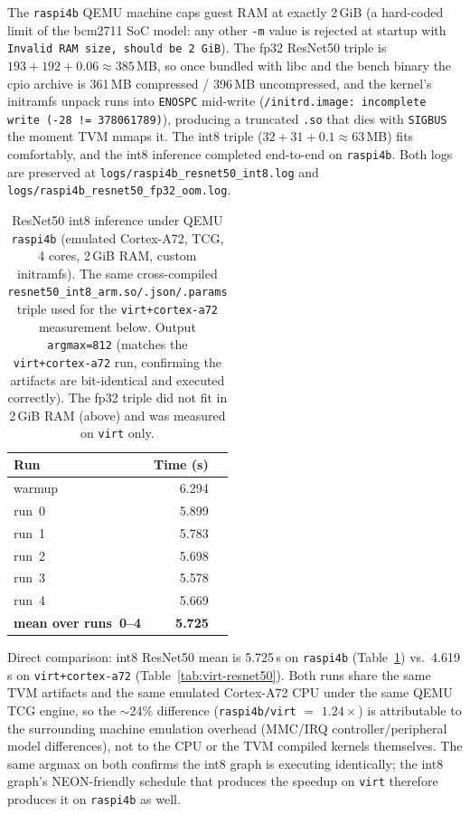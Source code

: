 \documentclass[11pt,a4paper]{article}
\begin{document}
The \texttt{raspi4b} QEMU machine caps guest RAM at exactly 2\,GiB (a hard-coded limit of the bcm2711 SoC model: any other \texttt{-m} value is rejected at startup with \texttt{Invalid RAM size, should be 2 GiB}). The fp32 ResNet50 triple is $193 + 192 + 0.06 \approx 385$\,MB, so once bundled with libc and the bench binary the cpio archive is 361\,MB compressed / 396\,MB uncompressed, and the kernel's initramfs unpack runs into \texttt{ENOSPC} mid-write (\texttt{/initrd.image: incomplete write (-28 != 378061789)}), producing a truncated \texttt{.so} that dies with \texttt{SIGBUS} the moment TVM mmaps it. The int8 triple ($32 + 31 + 0.1 \approx 63$\,MB) fits comfortably, and the int8 inference completed end-to-end on \texttt{raspi4b}. Both logs are preserved at \texttt{logs/raspi4b\_resnet50\_int8.log} and \texttt{logs/raspi4b\_resnet50\_fp32\_oom.log}.

\begin{table}[h]
\centering
\begin{tabular}{lrr}
\toprule
\textbf{Run} & \textbf{Time (s)} & \textbf{} \\
\midrule
warmup        & 6.294 & \\
run~0         & 5.899 & \\
run~1         & 5.783 & \\
run~2         & 5.698 & \\
run~3         & 5.578 & \\
run~4         & 5.669 & \\
\midrule
\textbf{mean over runs~0--4} & \textbf{5.725} & \\
\bottomrule
\end{tabular}
\caption{ResNet50 int8 inference under QEMU \texttt{raspi4b} (emulated Cortex-A72, TCG, 4 cores, 2\,GiB RAM, custom initramfs). The same cross-compiled \texttt{resnet50\_int8\_arm.so/.json/.params} triple used for the \texttt{virt+cortex-a72} measurement below. Output \texttt{argmax=812} (matches the \texttt{virt+cortex-a72} run, confirming the artifacts are bit-identical and executed correctly). The fp32 triple did not fit in 2\,GiB RAM (above) and was measured on \texttt{virt} only.}
\label{tab:raspi4b-resnet50}
\end{table}

Direct comparison: int8 ResNet50 mean is 5.725\,s on \texttt{raspi4b} (Table~\ref{tab:raspi4b-resnet50}) vs.\ 4.619\,s on \texttt{virt+cortex-a72} (Table~\ref{tab:virt-resnet50}). Both runs share the same TVM artifacts and the same emulated Cortex-A72 CPU under the same QEMU TCG engine, so the $\sim$24\% difference (\texttt{raspi4b/virt} $=$ $1.24\times$) is attributable to the surrounding machine emulation overhead (MMC/IRQ controller/peripheral model differences), not to the CPU or the TVM compiled kernels themselves. The same argmax on both confirms the int8 graph is executing identically; the int8 graph's NEON-friendly schedule that produces the speedup on \texttt{virt} therefore produces it on \texttt{raspi4b} as well.
\end{document}
